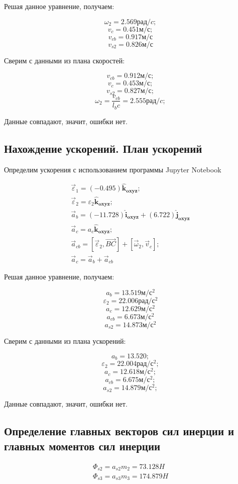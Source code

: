 Решая данное уравнение, получаем:

	$$\omega_2 = 2.569 рад/c;$$
	$$v_c = 0.451 м/с;$$
	$$v_{cb} = 0.917 м/с$$
	$$v_{s2} = 0.826 м/с$$

Сверим с данными из плана скоростей:

	$$v_{cb} = 0.912 м/с;$$
	$$v_{c} = 0.453 м/с;$$
	$$v_{s2} = 0.827 м/с;$$
	$$\omega_2 = \dfrac{v_{cb}}{l_bc} = 2.555 рад/c;$$

Данные совпадают, значит, ошибки нет.

\subsection{Нахождение ускорений. План ускорений}

Определим ускорения с использованием программы Jupyter Notebook

\begin{eqnarray}
	\vec \varepsilon_1 = (-0.495)\mathbf{\hat{k}_{oxyz}}; \\
	\vec \varepsilon_2 = \varepsilon_2\mathbf{\hat{k}_{oxyz}}; \\
	\vec a_b = (-11.728)\mathbf{\hat{i}_{oxyz}} + (6.722)\mathbf{\hat{j}_{oxyz}} \\
	\vec a_c = a_c \mathbf{\hat{k}_{oxyz}}; \\
	\vec a_{cb} = [\vec \varepsilon_2, \vec {BC}] + [\vec \omega_2, \vec v_c]; \\
	\vec a_c = \vec a_b + \vec a_{cb}
\end{eqnarray}

Решая данное уравнение, получаем:

	$$a_b = 13.519 м/с^2$$ 
	$$\varepsilon_2 = 22.006 рад/с^2$$
	$$a_c = 12.629 м/с^2$$ 
	$$a_{cb} = 6.673 м/с^2$$ 
	$$a_{s2} = 14.873 м/с^2$$ 

Сверим с данными из плана ускорений:

$$a_b = 13.520; $$
$$\varepsilon_2 = 22.004 рад/с^2; $$
$$a_c = 12.618 м/с^2; $$
$$a_{cb} = 6.675 м/с^2; $$
$$a_{s2} = 14.879 м/с^2; $$

Данные совпадают, значит, ошибки нет.

\subsection{Определение главных векторов сил инерции и главных моментов сил инерции}

\begin{eqnarray}
	\Phi_{s2} = a_{s2} m_2 = 73.128 H \\
	\Phi_{s3} = a_{s3} m_3 = 174.879 H 
\end{eqnarray}

